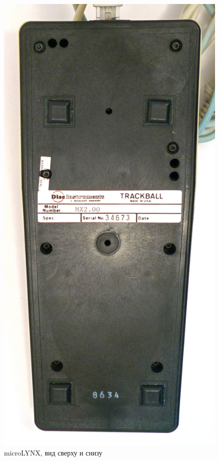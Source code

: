 \documentclass[11pt, a4paper]{article}
\begin{document}
\begin{figure}[h]
    \includegraphics[scale=0.4]{1986_honeywell_microlynx_trackball/bottom_30.jpg}
    \caption{microLYNX, вид сверху и снизу}
    \label{fig:microLYNXTopBottom}
\end{figure}
\end{document}
